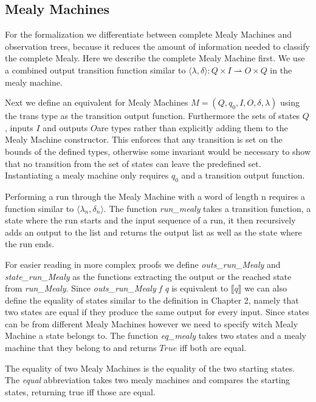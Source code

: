 \subsection{Mealy Machines}
For the formalization we differentiate between complete Mealy Machines and observation trees, because it reduces the amount of information needed to classify the complete Mealy. Here we describe the complete Mealy Machine first. We use a combined output transition function similar to $\langle\lambda,\delta\rangle:Q\times I\rightharpoonup O\times Q$ in the mealy machine. 
\begin{myisabelle}
	\transtype
\end{myisabelle}
Next we define an equivalent for Mealy Machines $M=(Q,q_0,I,O,\delta,\lambda)$ using the trans type as the transition output function. Furthermore the sets of states $Q$, inputs $I$ and outputs $O$are types rather than explicitly adding them to the Mealy Machine constructor. This enforces that any transition is set on the bounds of the defined types, otherwise some invariant would be necessary to show that no transition from the set of states can leave the predefined set. Instantiating a mealy machine only requires $q_0$ and a transition output function.
\begin{myisabelle}
	\mealytype
\end{myisabelle}
Performing a run through the Mealy Machine with a word of length n requires a function similar to $\langle\lambda_n,\delta_n\rangle$. The function \textit{run\_mealy} takes a transition function, a state where the run starts and the input sequence of a run, it then recursively adds an output to the list and returns the output list as well as the state where the run ends.
\begin{myisabelle}
	\runmealy
\end{myisabelle}
For easier reading in more complex proofs we define \textit{outs\_run\_Mealy} and \textit{state\_run\_Mealy} as the functions extracting the output or the reached state from \textit{run\_Mealy}. 
Since \textit{outs\_run\_Mealy f q} is equivalent to $\llbracket q\rrbracket$ we can also define the equality of states similar to the definition in Chapter 2, namely that two states are equal if they produce the same output for every input. Since states can be from different Mealy Machines however we need to specify witch Mealy Machine a state belongs to. The function \textit{eq\_mealy} takes two states and a mealy machine that they belong to and returns $True$ iff both are equal.
\begin{myisabelle}
	\eqmealydef
\end{myisabelle}
The equality of two Mealy Machines is the equality of the two starting states. The \textit{equal} abbreviation takes two mealy machines and compares the starting states, returning true iff those are equal.
\begin{myisabelle}
	\equal
\end{myisabelle}

